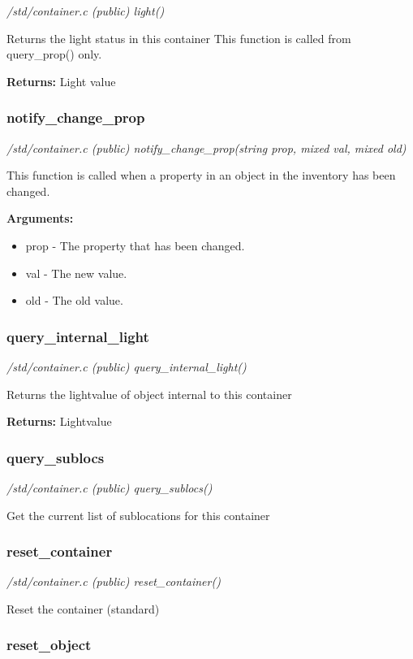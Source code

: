 {\em /std/container.c (public) light()}

Returns the light status in this container
This function is called from query\_prop() only.

{\bf Returns:}    Light value


\subsubsection{notify\_change\_prop}

{\em /std/container.c (public) notify\_change\_prop(string prop, mixed val, mixed old)}

This function is called when a property in an object
in the inventory has been changed.

{\bf Arguments:}
\begin{itemize}
\item     prop - The property that has been changed.
\item val  - The new value.
\item old  - The old value.
\end{itemize}


\subsubsection{query\_internal\_light}

{\em /std/container.c (public) query\_internal\_light()}

Returns the lightvalue of object internal to this container

{\bf Returns:}    Lightvalue


\subsubsection{query\_sublocs}

{\em /std/container.c (public) query\_sublocs()}

Get the current list of sublocations for this container


\subsubsection{reset\_container}

{\em /std/container.c (public) reset\_container()}

Reset the container (standard)


\subsubsection{reset\_object}

